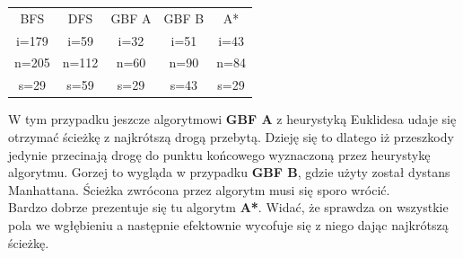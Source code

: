 \documentclass{article}
\begin{document}
\begin{center}
\begin{tabular}{c c c c c}
BFS & DFS & GBF A & GBF B & A* \\
i=179 & i=59 & i=32 & i=51 & i=43 \\
n=205 & n=112 & n=60 & n=90 & n=84\\
s=29 & s=59 & s=29 & s=43 & s=29\\
\end{tabular}
\end{center}
W tym przypadku jeszcze algorytmowi \textbf{GBF A} z heurystyką Euklidesa udaje się otrzymać ścieżkę z najkrótszą drogą przebytą. Dzieję się to dlatego iż przeszkody jedynie przecinają drogę do punktu końcowego wyznaczoną przez heurystykę algorytmu. Gorzej to wygląda w przypadku \textbf{GBF B}, gdzie użyty został dystans Manhattana. Ścieżka zwrócona przez algorytm musi się sporo wrócić.\\
Bardzo dobrze prezentuje się tu algorytm \textbf{A*}. Widać, że sprawdza on wszystkie pola we wgłębieniu a następnie efektownie wycofuje się z niego dając najkrótszą ścieżkę. 
\end{document}
